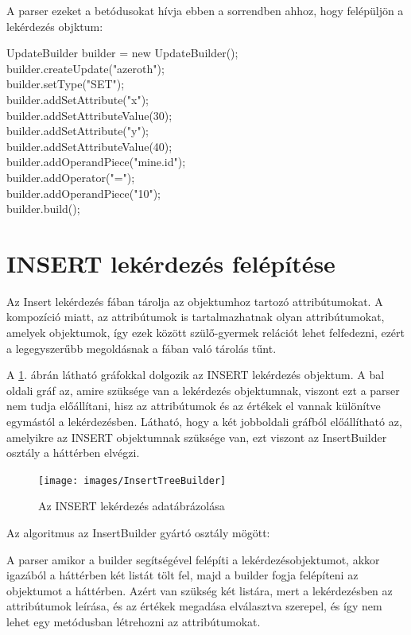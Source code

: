 A parser ezeket a betódusokat hívja ebben a sorrendben ahhoz, hogy felépüljön a lekérdezés objktum:

UpdateBuilder builder = new UpdateBuilder(); \\
builder.createUpdate("azeroth"); \\
builder.setType("SET"); \\
builder.addSetAttribute("x"); \\
builder.addSetAttributeValue(30); \\
builder.addSetAttribute("y"); \\
builder.addSetAttributeValue(40); \\
builder.addOperandPiece("mine.id"); \\
builder.addOperator("="); \\
builder.addOperandPiece("10"); \\
builder.build(); \\


\section{INSERT lekérdezés felépítése}

Az Insert lekérdezés fában tárolja az objektumhoz tartozó attribútumokat. A kompozíció miatt, az attribútumok is tartalmazhatnak olyan attribútumokat, amelyek objektumok, így ezek között szülő-gyermek relációt lehet felfedezni, ezért a legegyszerűbb megoldásnak a fában való tárolás tűnt.

A  \ref{fig:insertTreeBuilder}. ábrán látható gráfokkal dolgozik az INSERT lekérdezés objektum. A bal oldali gráf az, amire szüksége van a lekérdezés objektumnak, viszont ezt a parser nem tudja előállítani, hisz az attribútumok és az értékek el vannak különítve egymástól a lekérdezésben. Látható, hogy a két jobboldali gráfból előállítható az, amelyikre az INSERT objektumnak szüksége van, ezt viszont az InsertBuilder osztály a háttérben elvégzi.



\begin{figure}[htb]
	\begin{center}
		\texttt{[image: images/InsertTreeBuilder]}
		\caption{Az INSERT lekérdezés adatábrázolása }
		\label{fig:insertTreeBuilder}
	\end{center}
\end{figure}


Az algoritmus az InsertBuilder gyártó osztály mögött:

A parser amikor a builder segítségével felépíti a lekérdezésobjektumot, akkor igazából a háttérben két listát tölt fel, majd a builder fogja felépíteni az objektumot a háttérben. Azért van szükség két listára, mert a lekérdezésben az attribútumok leírása, és az értékek megadása elválasztva szerepel, és így nem lehet egy metódusban létrehozni az attribútumokat. 

